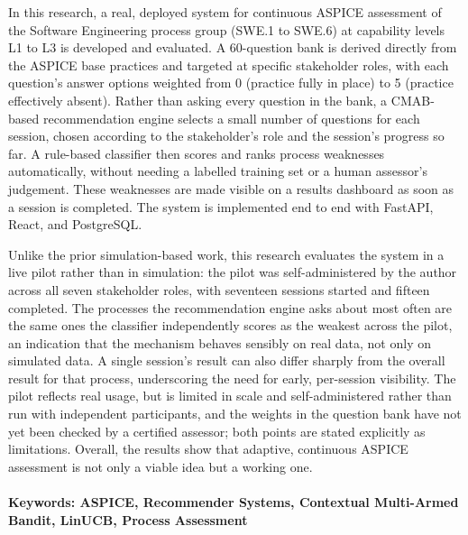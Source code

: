 \documentclass[a4paper, 12pt, oneside, openany, BCOR1cm,toc=chapterentrywithdots]{scrbook}
\renewcommand*{\tableofcontents}{%
  	\begingroup
  	\tocsection
  	\tocfile{\contentsname}{toc}
  	\endgroup
}
\renewcommand*{\listoffigures}{%
  	\begingroup
  	\tocsection
  	\tocfile{\listfigurename}{lof}
  	\endgroup
}
\renewcommand{\listoftables}{
	\begingroup
	\tocsection
	\tocfile{\listtablename}{lot}
	\endgroup
}
\begin{document}
In this research, a real, deployed system for continuous ASPICE assessment of the Software
Engineering process group (SWE.1 to SWE.6) at capability levels L1 to L3 is developed and
evaluated. A 60-question bank is derived directly from the ASPICE base practices and targeted at
specific stakeholder roles, with each question's answer options weighted from 0 (practice fully
in place) to 5 (practice effectively absent). Rather than asking every question in the bank, a
CMAB-based recommendation engine selects a small number of questions for each session, chosen
according to the stakeholder's role and the session's progress so far. A rule-based classifier
then scores and ranks process weaknesses automatically, without needing a labelled training set
or a human assessor's judgement. These weaknesses are made visible on a results dashboard as
soon as a session is completed. The system is implemented end to end with FastAPI, React, and
PostgreSQL.

Unlike the prior simulation-based work, this research evaluates the system in a live pilot
rather than in simulation: the pilot was self-administered by the author across all seven
stakeholder roles, with seventeen sessions started and fifteen completed. The processes the
recommendation engine asks about most often are the same ones the classifier independently
scores as the weakest across the pilot, an indication that the mechanism behaves sensibly on
real data, not only on simulated data. A single session's result can also differ sharply from
the overall result for that process, underscoring the need for early, per-session visibility.
The pilot reflects real usage, but is limited in scale and self-administered rather than run
with independent participants, and the weights in the question bank have not yet been checked
by a certified assessor; both points are stated explicitly as limitations. Overall, the results
show that adaptive, continuous ASPICE assessment is not only a viable idea but a working one.
\\\\
\textbf{Keywords: ASPICE, Recommender Systems, Contextual Multi-Armed Bandit, LinUCB, Process Assessment}


\tableofcontents
\listoffigures
\listoftables
\end{document}
